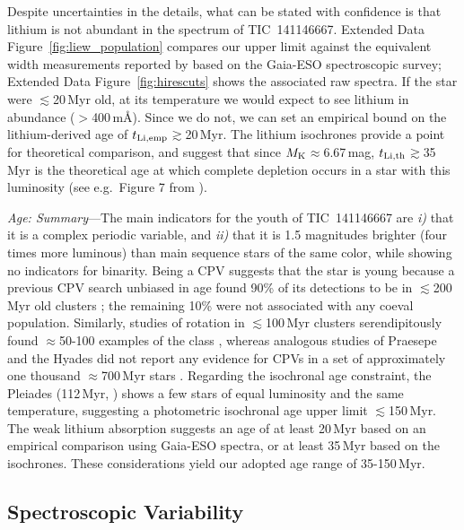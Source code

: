 \documentclass{nature3}
\begin{document}
\begin{methods}
Despite uncertainties in the details, what can be stated with confidence
is that lithium is not abundant in the spectrum of TIC~141146667.
Extended Data Figure~\ref{fig:liew_population} compares our upper limit against the
equivalent width measurements reported by \cite{Jeffries2023}
based on the Gaia-ESO spectroscopic survey; Extended Data Figure~\ref{fig:hirescuts}
shows the associated raw spectra.  If the star were $\lesssim$20\,Myr
old, at its temperature we would expect to see lithium in abundance
($>$400\,m\AA).  Since we do not, we can set an empirical bound on the
lithium-derived age of $t_{\rm Li,emp}$$\gtrsim$20\,Myr.  The
\cite{Feiden2016} lithium isochrones provide a point for theoretical
comparison, and suggest that since $M_{\rm K}$$\approx$6.67\,mag,
$t_{\rm Li,th}$$\gtrsim$35\,Myr is the theoretical age at which
complete depletion occurs in a star with this luminosity (see
e.g.~Figure 7 from \cite{Wood2023}).




{\it Age: Summary}---The main indicators for the youth of
TIC~141146667 are {\it i)} that it is a complex periodic variable, and
{\it ii)} that it is 1.5 magnitudes brighter (four times more
luminous) than main sequence stars of the same color, while showing no
indicators for binarity.  Being a CPV suggests that the star is young
because a previous CPV search unbiased in age found 90\% of its
detections to be in $\lesssim$200\,Myr old clusters \cite{Bouma2024};
the remaining 10\% were not associated with any coeval
population.
Similarly, studies of rotation in $\lesssim$100\,Myr clusters serendipitously found
$\approx$50-100 examples of the class
\cite{Rebull2016,Stauffer2017,Stauffer2018,Rebull2018,Zhan2019,Rebull2020,Stauffer2021,Rebull2022,Popinchalk2023},
whereas analogous studies of Praesepe and the Hyades did not report
any evidence for CPVs in a set of approximately one thousand
$\approx$700\,Myr stars \cite{Rebull2017,Douglas2019,Rampalli2021}.
Regarding the isochronal age constraint, the Pleiades (112\,Myr,
\cite{Dahm2015}) shows a few stars of equal luminosity and the same
temperature, suggesting a photometric isochronal age upper limit
$\lesssim$150\,Myr.  The weak lithium absorption suggests an age of at
least 20\,Myr based on an empirical comparison using Gaia-ESO spectra,
or at least 35\,Myr based on the \cite{Feiden2016} isochrones.  These
considerations yield our adopted age range of 35-150\,Myr.




\subsection{Spectroscopic Variability}\phantom{+}
\label{subsec:specvar}


\end{methods}
\end{document}
